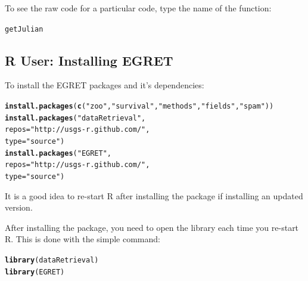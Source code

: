 \documentclass[a4paper,11pt]{article}\usepackage{graphicx, color}
\makeatletter
\newcommand{\hlfunctioncall}[1]{\textcolor[rgb]{0.501960784313725,0,0.329411764705882}{\textbf{#1}}}%
\newcommand{\hlstring}[1]{\textcolor[rgb]{0.6,0.6,1}{#1}}%
\newenvironment{kframe}{%
 \def\at@end@of@kframe{}%
 \ifinner\ifhmode%
  \def\at@end@of@kframe{\end{minipage}}%
  \begin{minipage}{\columnwidth}%
 \fi\fi%
 \def\FrameCommand##1{\hskip\@totalleftmargin \hskip-\fboxsep
 \colorbox{shadecolor}{##1}\hskip-\fboxsep
     \hskip-\linewidth \hskip-\@totalleftmargin \hskip\columnwidth}%
 \MakeFramed {\advance\hsize-\width
   \@totalleftmargin\z@ \linewidth\hsize
   \@setminipage}}%
 {\par\unskip\endMakeFramed%
 \at@end@of@kframe}
\newenvironment{knitrout}{}{} %
\makeatother
\begin{document}
To see the raw code for a particular code, type the name of the function:
\begin{knitrout}
\color{fgcolor}\begin{kframe}
\begin{alltt}
getJulian
\end{alltt}
\end{kframe}
\end{knitrout}



\subsection{R User: Installing EGRET}
To install the EGRET packages and it's dependencies:

\begin{knitrout}
\color{fgcolor}\begin{kframe}
\begin{alltt}
\hlfunctioncall{install.packages}(\hlfunctioncall{c}(\hlstring{"zoo"},\hlstring{"survival"},\hlstring{"methods"},\hlstring{"fields"},\hlstring{"spam"}))
\hlfunctioncall{install.packages}(\hlstring{"dataRetrieval"}, 
                 repos=\hlstring{"http://usgs-r.github.com/"}, 
                 type=\hlstring{"source"})
\hlfunctioncall{install.packages}(\hlstring{"EGRET"}, 
                 repos=\hlstring{"http://usgs-r.github.com/"}, 
                 type=\hlstring{"source"})
\end{alltt}
\end{kframe}
\end{knitrout}


It is a good idea to re-start R after installing the package if installing an updated version. 

After installing the package, you need to open the library each time you re-start R.  This is done with the simple command:
\begin{knitrout}
\color{fgcolor}\begin{kframe}
\begin{alltt}
\hlfunctioncall{library}(dataRetrieval)
\hlfunctioncall{library}(EGRET)
\end{alltt}
\end{kframe}
\end{knitrout}
\end{document}
